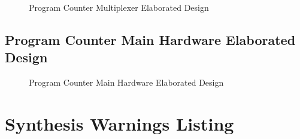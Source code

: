 \documentclass[
    a4paper, %
	12pt, %
    ]{CSSullivanBusinessReport}
\begin{document}
\begin{fullwidth}
\begin{figure}[H]
    \captionsetup{style=widetable}
    \caption{Program Counter Multiplexer Elaborated Design}
    \label{fig:PCMUXElaboratedDesign}
\end{figure}

\subsection{Program Counter Main Hardware Elaborated Design} %

\begin{figure}[H]
    \caption{Program Counter Main Hardware Elaborated Design}
    \label{fig:PCMainHardwareElaboratedDesign}
\end{figure}

\section{Synthesis Warnings Listing} %


\end{fullwidth}
\end{document}
